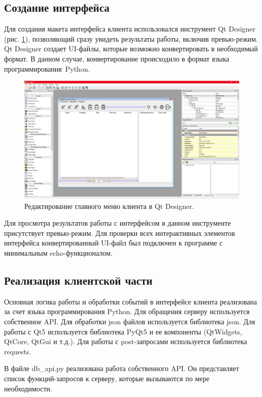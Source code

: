 \subsection{Создание интерфейса}
Для создания макета интерфейса клиента использовался инструмент Qt Designer (рис. \ref{fig:qtdesigner}),
позволяющий сразу увидеть результаты работы, включив превью-режим. Qt Designer создает UI-файлы, которые возможно конвертировать в необходимый формат.
В данном случае, конвертирование происходило в формат языка программирования Python.
\begin{figure}[h]
    \centering
    \includegraphics[width=1\linewidth]{img/qtdesigner.png}
    \caption{Редактирование главного меню клиента в Qt Designer.}
    \label{fig:qtdesigner}
\end{figure}

Для просмотра результатов работы с интерфейсом в данном инструменте присутствует превью-режим.
Для проверки всех интерактивных элементов интерфейса конвертированный UI-файл был подключен к программе с минимальным echo-функционалом.


\clearpage
\subsection{Реализация клиентской части}
Основная логика работы и обработки событий в интерфейсе клиента реализована за счет языка программирования Python.
Для обращения серверу используется собственное API. Для обработки json файлов используется библиотека json.
Для работы с Qt5 используется библиотека PyQt5 и ее компоненты (QtWidgets, QtCore, QtGui и т.д.).
Для работы с post-запросами используется библиотека requests.

В файле db\_api.py реализована работа собственного API. Он представляет список функций-запросов к серверу, которые вызываются по мере необходимости.

